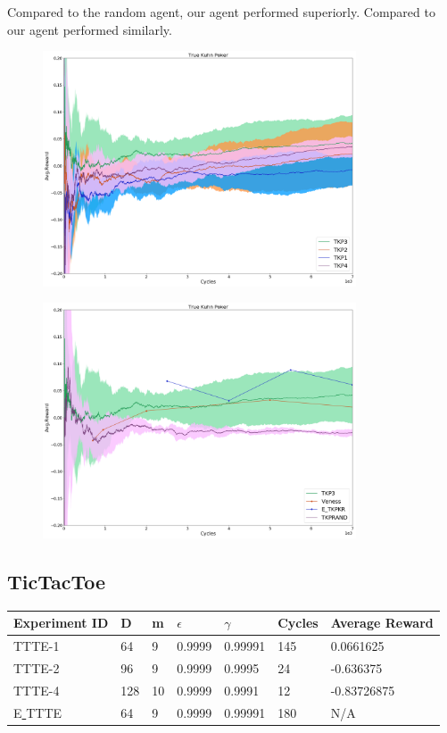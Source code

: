 \documentclass{article}
\theoremstyle{definition}
\newtheorem{primary statistics}[definition]{Primary Statistics}
\newtheorem{auxiliary statistics}[definition]{Auxiliary Statistics}
\begin{document}
Compared to the random agent, our agent performed superiorly. Compared to \citep{veness2011monte} our agent performed similarly.

 \begin{figure}[h]
 \centering
    \includegraphics[width=9.3cm]{4_True_Kuhn_Poker}
\end{figure}

 \begin{figure}[h]
 \centering
    \includegraphics[width=9.3cm]{True_Kuhn_Poker}
\end{figure}

\newpage

\subsection{TicTacToe}
\begin{tabular}{|l|l|l|l|l|l|l|}
 \hline \centering
 Experiment ID& D & m & $\epsilon$ & $\gamma$ & Cycles & Average Reward \\ \hline
TTTE-1   & 64        & 9           & 0.9999      & 0.99991           & 145    & 0.0661625         \\ \hline
TTTE-2   & 96        & 9           & 0.9999      & 0.9995            & 24     & -0.636375         \\ \hline
TTTE-4   & 128       & 10          & 0.9999      & 0.9991            & 12     & -0.83726875  \\  \hline  
E\underline{ }TTTE  & 64       & 9          & 0.9999      & 0.99991            & 180     & N/A  \\  \hline    
\end{tabular}
\end{document}
